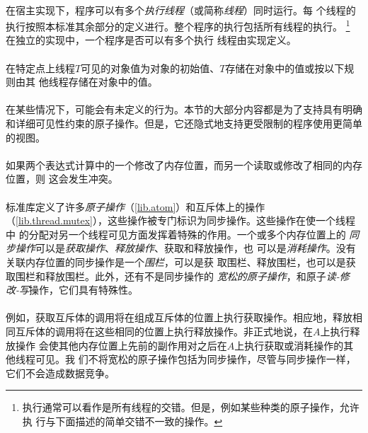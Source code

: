 
\paragraph{}
在宿主实现下，程序可以有多个\textit{执行线程}（或简称\textit{线程}）同时运行。每
个线程的执行按照本标准其余部分的定义进行。整个程序的执行包括所有线程的执行。
\footnote{执行通常可以看作是所有线程的交错。但是，例如某些种类的原子操作，允许执
行与下面描述的简单交错不一致的操作。} 在独立的实现中，一个程序是否可以有多个执行
线程由实现定义。

\paragraph{}
在特定点上线程$T$可见的对象值为对象的初始值、$T$存储在对象中的值或按以下规则由其
他线程存储在对象中的值。

\paragraph{}
\notes 在某些情况下，可能会有未定义的行为。本节的大部分内容都是为了支持具有明确
和详细可见性约束的原子操作。但是，它还隐式地支持更受限制的程序使用更简单的视图。

\paragraph{}
如果两个表达式计算中的一个修改了内存位置，而另一个读取或修改了相同的内存位置，则
这会发生冲突。

\paragraph{}
标准库定义了许多\textit{原子操作}（\ref{lib.atom}）和互斥体上的操作
（\ref{lib.thread.mutex}），这些操作被专门标识为同步操作。这些操作在使一个线程中
的分配对另一个线程可见方面发挥着特殊的作用。一个或多个内存位置上的
\textit{同步操作}可以是\textit{获取操作}、\textit{释放操作}、获取和释放操作，也
可以是\textit{消耗操作}。没有关联内存位置的同步操作是一个\textit{围栏}，可以是获
取围栏、释放围栏，也可以是获取围栏和释放围栏。此外，还有不是同步操作的
\textit{宽松的原子操作}，和原子\textit{读-修改-写}操作，它们具有特殊性。

\paragraph{}
\notes 例如，获取互斥体的调用将在组成互斥体的位置上执行获取操作。相应地，释放相
同互斥体的调用将在这些相同的位置上执行释放操作。非正式地说，在$A$上执行释放操作
会使其他内存位置上先前的副作用对之后在$A$上执行获取或消耗操作的其他线程可见。我
们不将宽松的原子操作包括为同步操作，尽管与同步操作一样，它们不会造成数据竞争。

